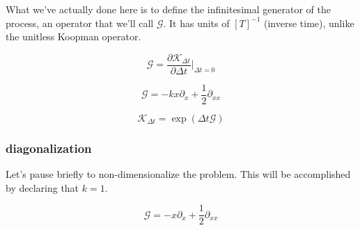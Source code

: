 \documentclass[]{article}
\newcommand{\p}[1]{\left( #1 \right)}
\newcommand{\parfr}[2]{\frac{\partial #1}{\partial #2}}
\newcommand{\II}{\mathbb{I}}
\newcommand{\Kp}{\mathcal{K}}
\begin{document}
What we've actually done here is to define the infinitesimal generator of the process, an operator that we'll call $\mathcal{G}$. It has units of $[T]^{-1}$ (inverse time), unlike the unitless Koopman operator.

$$
\mathcal{G} = \parfr{\Kp_{\Delta t}}{\Delta t} \Big\vert_{\Delta t = 0}
$$

$$
\mathcal{G} = -kx\partial_x + \frac{1}{2}\partial_{xx}
$$

$$
\Kp_{\Delta t} = \exp(\Delta t \mathcal{G})
$$

\iffalse
\subsubsection{continuous time operator}

This particular process is continuous in time, so we'll find it useful to fix $\Delta t$, and then consider subdividing the timestep interval into finer and finer pieces. We can then infer:

$$
\Kp_{\Delta t} = \p{\Kp_{\Delta t / n}}^n
$$

$$
\lim_{n\to \infty} \Kp_{\Delta t / n} = \II
$$

And then for some operator $\mathcal{G}_{\Delta t}$, it turns out that we have:

$$
\lim_{n\to \infty} n\p{\Kp_{\Delta t / n} - \II} = \mathcal{G}_{\Delta t}
$$

$$
\Kp_{\Delta t} = \lim_{n \to \infty} \p{\II + \frac{1}{n}\mathcal{G}_{\Delta t}}^n = \exp\p{\mathcal{G}_{\Delta t}}
$$

So the Koopman operator for a finite amount of time can be built up by multiplying operators for many infinitesimal changes. And we can also write this as $\exp\p{\mathcal{G}_{\Delta t}}$.

Obtain the Koopman operator for an arbitrary time $\tau$ by exponentiating:

$$
\Kp_\tau = \exp\p{\frac{\tau}{\Delta t}\mathcal{G}_{\Delta t}}
$$

\fi

\subsubsection{diagonalization}

Let's pause briefly to non-dimensionalize the problem. This will be accomplished by declaring that $k=1$.

$$
\mathcal{G} = -x\partial_x + \frac{1}{2}\partial_{xx}
$$
\end{document}

